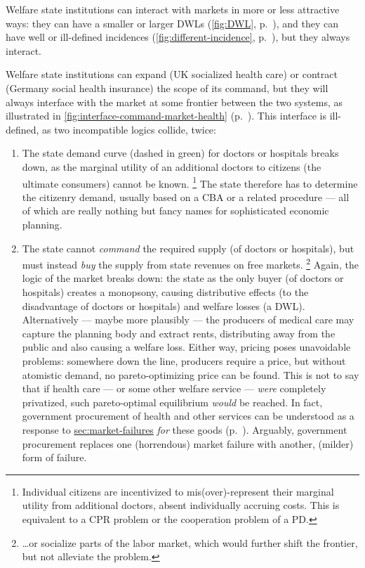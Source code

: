 Welfare state institutions can interact with markets in more or less attractive ways:
they can have a smaller or larger \glspl{DWL} (\autoref{fig:DWL}, p.~\pageref{fig:DWL}), and they can have well or ill-defined incidences (\autoref{fig:different-incidence}, p.~\pageref{fig:different-incidence}), but they always interact.%

Welfare state institutions can expand (UK socialized health care) or contract (Germany social health insurance) the scope of its command, but they will always interface with the market at some frontier between the two systems, as illustrated in \autoref{fig:interface-command-market-health} (p.~\pageref{fig:interface-command-market-health}).
This interface is ill-defined, as two incompatible logics collide, twice:

\begin{enumerate}
	\item
		The state demand curve (dashed in green) for doctors or hospitals breaks down, as the marginal utility of an additional doctors to citizens (the ultimate consumers) cannot be known.
		\footnote{
			Individual citizens are incentivized to mis(over)-represent their marginal utility from additional doctors, absent individually accruing costs.
			This is equivalent to a \gls{CPR} problem or the cooperation problem of a \gls{PD}.
		}
		The state therefore has to determine the citizenry demand, usually based on a \gls{CBA} or a related procedure --- all of which are really nothing but fancy names for sophisticated economic planning.
	\item
		The state cannot \emph{command} the required supply (of doctors or hospitals), but must instead \emph{buy} the supply from state revenues on free markets.
		\footnote{
			\ldots or socialize parts of the labor market, which would further shift the frontier, but not alleviate the problem.
		}
		Again, the logic of the market breaks down:
the state as the only buyer (of doctors or hospitals) creates a monopsony, causing distributive effects (to the disadvantage of doctors or hospitals) and welfare losses (a \gls{DWL}).
		Alternatively --- maybe more plausibly --- the producers of medical care may capture the planning body and extract rents, distributing away from the public and also causing a welfare loss.
		Either way, pricing poses unavoidable problems:
somewhere down the line, producers require a price, but without atomistic demand, no pareto-optimizing price can be found.
		This is not to say that if health care --- or some other welfare service --- \emph{were} completely privatized, such pareto-optimal equilibrium \emph{would} be reached.
		In fact, government procurement of health and other services can be understood as a response to \hyperref[failed atomistic markets]{sec:market-failures} \emph{for} these goods (p.~\pageref{sec:market-failures}).
		Arguably, government procurement replaces one (horrendous) market failure with another, (milder) form of failure.
\end{enumerate}

